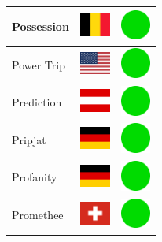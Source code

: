 \documentclass[12pt, a4paper, twoside]{report}
\begin{document}
\begin{center}
\begin{longtable}{|p{5cm}|p{2cm}|p{2cm}|}
			Possession & \includegraphics[width=1cm]{4x3/be} & \includegraphics[width=1cm]{likes/y} \\ \hline
			Power Trip & \includegraphics[width=1cm]{4x3/us} & \includegraphics[width=1cm]{likes/y} \\ \hline
			Prediction & \includegraphics[width=1cm]{4x3/at} & \includegraphics[width=1cm]{likes/y} \\ \hline
			Pripjat & \includegraphics[width=1cm]{4x3/de} & \includegraphics[width=1cm]{likes/y} \\ \hline
			Profanity & \includegraphics[width=1cm]{4x3/de} & \includegraphics[width=1cm]{likes/y} \\ \hline
			Promethee & \includegraphics[width=1cm]{4x3/ch} & \includegraphics[width=1cm]{likes/y} \\ \hline

\end{longtable}
\end{center}
\end{document}

